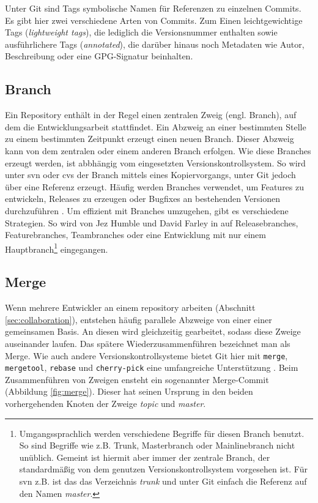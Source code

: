 Unter Git sind Tags symbolische Namen für Referenzen zu einzelnen Commits. Es
gibt hier zwei verschiedene Arten von Commits. Zum Einen leichtgewichtige Tags
(\textit{lightweight tags}), die lediglich die Versionsnummer enthalten sowie
ausführlichere Tags (\textit{annotated}), die darüber hinaus noch Metadaten wie
Autor, Beschreibung oder eine GPG-Signatur beinhalten. \cite[S.~21]{gitosp}

\subsection{Branch}\label{sec:branch}
Ein Repository enthält in der Regel einen zentralen Zweig (engl. Branch),
auf dem die Entwicklungsarbeit stattfindet. Ein Abzweig an einer bestimmten
Stelle zu einem bestimmten Zeitpunkt erzeugt einen neuen Branch. Dieser
Abzweig kann von dem zentralen oder einem anderen Branch erfolgen. Wie diese
Branches erzeugt werden, ist abbhängig vom eingesetzten Versionskontrollsystem.
So wird unter \acrshort{svn} oder \acrshort{cvs} der Branch mittels
eines Kopiervorgangs, unter Git jedoch über eine Referenz erzeugt. Häufig
werden Branches verwendet, um Features zu entwickeln, Releases zu erzeugen oder
Bugfixes an bestehenden Versionen durchzuführen \cite[S.~21]{gitosp}. Um
effizient mit Branches umzugehen, gibt es verschiedene Strategien. So wird von
Jez Humble und David Farley in \cite[S.~408-412]{cd} auf Releasebranches,
Featurebranches, Teambranches oder eine Entwicklung mit nur einem
Hauptbranch\footnote{Umgangssprachlich werden verschiedene Begriffe für diesen
Branch benutzt. So sind Begriffe wie z.B. Trunk, Masterbranch oder
Mainlinebranch nicht unüblich. Gemeint ist hiermit aber immer der
zentrale Branch, der standardmäßig von dem genutzen Versionskontrollsystem vorgesehen
ist. Für \acrshort{svn} z.B. ist das das Verzeichnis
\textit{trunk} und unter Git einfach die Referenz auf den Namen
\textit{master}.} eingegangen.

\subsection{Merge}\label{sec:merge}
Wenn mehrere Entwickler an einem \gls{repository} arbeiten (Abschnitt
\ref{sec:collaboration}), entstehen häufig parallele Abzweige von einer einer
gemeinsamen Basis. An diesen wird gleichzeitig gearbeitet, sodass diese Zweige
auseinander laufen. Das spätere Wiederzusammenführen bezeichnet man als Merge.
Wie auch andere Versionskontrollsysteme bietet Git hier mit \texttt{merge},
\texttt{mergetool}, \texttt{rebase} und \texttt{cherry-pick} eine umfangreiche
Unterstützung \cite[S.~vii]{gitwf}. Beim Zusammenführen von Zweigen ensteht ein
sogenannter Merge-Commit (Abbildung \ref{fig:merge}). Dieser hat seinen
Ursprung in den beiden vorhergehenden Knoten der Zweige \textit{topic} und
\textit{master}.

